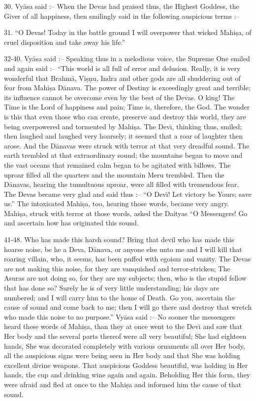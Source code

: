 30. Vy\=asa said :-- When the Devas had praised thus, the Highest Goddess, the Giver of all happiness, then smilingly said in the following auspicious terms :--

31. ``O Devas! Today in the battle ground I will overpower that wicked Mahi\d{s}a, of cruel disposition and take away his life.''

32-40. Vy\=asa said :-- Speaking thus in a melodious voice, the Supreme One smiled and again said :-- ``This world is all full of error and delusion. Really, it is very wonderful that Brahm\=a, Vi\d{s}\d{n}u, Indra and other gods are all shuddering out of fear from Mahi\d{s}a D\=anava. The power of Destiny is exceedingly great and terrible; its influence cannot be overcome even by the best of the Devas. O king! The Time is the Lord of happiness and pain; Time is, therefore, the God. The wonder is this that even those who can create, preserve and destroy this world, they are being overpowered and tormented by Mahi\d{s}a. The Dev\={\i}, thinking thus, smiled; then laughed and laughed very hoarsely; it seemed that a roar of laughter then arose. And the D\=anavas were struck with terror at that very dreadful sound. The earth trembled at that extraordinary sound; the mountains began to move and the vast oceans that remained calm began to be agitated with billows. The uproar filled all the quarters and the mountain Meru trembled. Then the D\=anavas, hearing the tumultuous uproar, were all filled with tremendous fear. The Devas became very glad and said thus :-- ``O Dev\={\i}! Let victory be Yours; save us.'' The intoxicated Mahi\d{s}a, too, hearing those words, became very angry. Mahi\d{s}a, struck with terror at those words, asked the Daityas ``O Messengers! Go and ascertain how has originated this sound.

41-48. Who has made this harsh sound? Bring that devil who has made this hoarse noise, be he a Deva, D\=anava, or anyone else unto me and I will kill that roaring villain, who, it seems, has been puffed with egoism and vanity. The Devas are not making this noise, for they are vanquished and terror-stricken; The Asuras are not doing so, for they are my subjects; then, who is the stupid fellow that has done so? Surely he is of very little understanding; his days are numbered; and I will carry him to the home of Death. Go you, ascertain the cause of sound and come back to me; then I will go there and destroy that wretch who made this noise to no purpose.'' Vy\=asa said :-- No sooner the messengers heard these words of Mahi\d{s}a, than they at once went to the Dev\={\i} and saw that Her body and the several parts thereof were all very beautiful; She had eighteen hands, She was decorated completely with various ornaments all over Her body, all the auspicious signs were being seen in Her body and that She was holding excellent divine weapons. That auspicious Goddess beautiful, was holding in Her hands, the cup and drinking wine again and again. Beholding Her this form, they were afraid and fled at once to the Mahi\d{s}a and informed him the cause of that sound.

